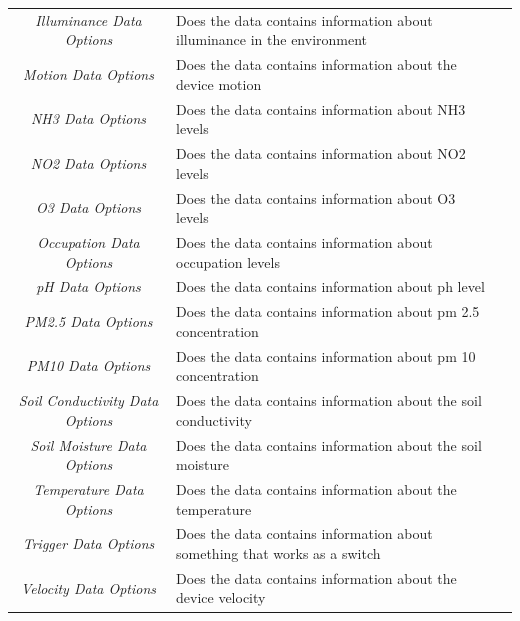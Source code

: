 \begin{landscape}
\begin{longtable}{cll}
   \textit{Illuminance Data Options}       & Does the data contains information about illuminance in the environment\footnotemark[1]\footnotemark[2]   &  \\
   \textit{Motion Data Options}            & Does the data contains information about the device motion\footnotemark[1]\footnotemark[2]                &  \\
   \textit{NH3 Data Options}               & Does the data contains information about NH3 levels\footnotemark[1]\footnotemark[2]                       &  \\
   \textit{NO2 Data Options}               & Does the data contains information about NO2 levels\footnotemark[1]\footnotemark[2]                       &  \\
   \textit{O3 Data Options}                & Does the data contains information about O3 levels\footnotemark[1]\footnotemark[2]                        &  \\
   \textit{Occupation Data Options}        & Does the data contains information about occupation levels\footnotemark[1]\footnotemark[2]                &  \\
   \textit{pH Data Options}                & Does the data contains information about ph level\footnotemark[1]\footnotemark[2]                         &  \\
   \textit{PM2.5 Data Options}             & Does the data contains information about pm 2.5 concentration\footnotemark[1]\footnotemark[2]             &  \\
   \textit{PM10 Data Options}              & Does the data contains information about pm 10 concentration\footnotemark[1]\footnotemark[2]              &  \\
   \textit{Soil Conductivity Data Options} & Does the data contains information about the soil conductivity\footnotemark[1]\footnotemark[2]            &  \\
   \textit{Soil Moisture Data Options}     & Does the data contains information about the soil moisture\footnotemark[1]\footnotemark[2]                &  \\
   \textit{Temperature Data Options}       & Does the data contains information about the temperature\footnotemark[1]\footnotemark[2]                  &  \\
   \textit{Trigger Data Options}           & Does the data contains information about something that works as a switch\footnotemark[1]\footnotemark[2] &  \\
   \textit{Velocity Data Options}          & Does the data contains information about the device velocity\footnotemark[1]\footnotemark[2]              &  \\

\end{longtable}
\end{landscape}
